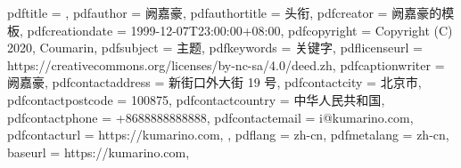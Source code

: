 
\hypersetup
{
	pdftitle			= {\homeworkName},
	pdfauthor			= {阙嘉豪},
	pdfauthortitle		= {头衔},
	pdfcreator			= {阙嘉豪的模板},
	pdfcreationdate		= {1999-12-07T23:00:00+08:00},
	pdfcopyright		= {Copyright (C) 2020, Coumarin},
	pdfsubject			= {主题},
	pdfkeywords			= {关键字},
	pdflicenseurl		= {https://creativecommons.org/licenses/by-nc-sa/4.0/deed.zh},
	pdfcaptionwriter	= {阙嘉豪},
	pdfcontactaddress	= {新街口外大街 19 号},
	pdfcontactcity		= {北京市},
	pdfcontactpostcode	= {100875},
	pdfcontactcountry	= {中华人民共和国},
	pdfcontactphone		= {+8688888888888},
	pdfcontactemail		= {i@kumarino.com},
	pdfcontacturl		= {%
		https://kumarino.com,
	},
	pdflang				= {zh-cn},
	pdfmetalang			= {zh-cn},
	baseurl				= {https://kumarino.com},
}
